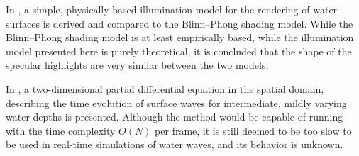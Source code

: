 In , a simple, physically based illumination model for the rendering of water surfaces is derived and compared to the Blinn--Phong shading model. While the Blinn--Phong shading model is at least empirically based, while the illumination model presented here is purely theoretical, it is concluded that the shape of the specular highlights are very similar between the two models.

In , a two-dimensional partial differential equation in the spatial domain, describing the time evolution of surface waves for intermediate, mildly varying water depths is presented. Although the method would be capable of running with the time complexity $O(N)$ per frame, it is still deemed to be too slow to be used in real-time simulations of water waves, and its behavior is unknown.